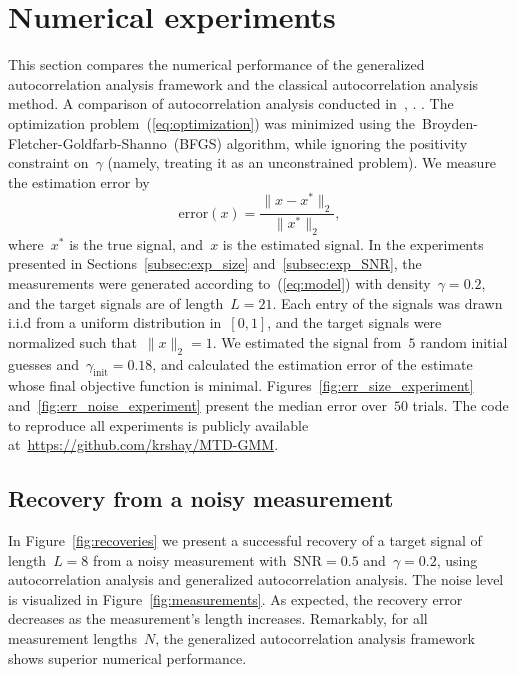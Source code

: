 \documentclass{article}
\newcommand{\rev}[1]{{\color{magenta}{#1}}}
\begin{document}
\section{Numerical experiments}
\label{sec:numerical}
This section compares the numerical performance of the generalized autocorrelation analysis framework and the classical autocorrelation analysis method. A comparison of autocorrelation analysis \rev{to a naive method that detects and extracts the signal occurrences, and then averages, was} conducted in~\cite{lan2020multi}, \cite{kreymer2021two}. \rev{While this method works well in a high SNR environment, it fails in low SNR regimes---the focal point of this paper---and thus omitted}. The optimization problem~(\ref{eq:optimization}) was minimized using the~\mbox{Broyden-Fletcher-Goldfarb-Shanno}~(BFGS) algorithm, while ignoring the positivity constraint on~$\gamma$ (namely, treating it as an unconstrained problem).  We measure the estimation error by
\begin{equation*}
\text{error}(x) = \frac{\|x - x^*\|_2}{\|x^*\|_2},
\end{equation*}
where~$x^*$ is the true signal, and~$x$ is the estimated signal. In the experiments presented in Sections~\ref{subsec:exp_size} and~\ref{subsec:exp_SNR}, the measurements were generated according to~(\ref{eq:model}) with density~\mbox{$\gamma = 0.2$}, and the target signals are of length~\mbox{$L = 21$}. Each entry of the signals was drawn i.i.d from a uniform distribution in~$[0,1]$, and the target signals were normalized such that~$\|x\|_2  =1$. We estimated the signal from~$5$ random initial guesses \rev{of the signal that were generated similarly to the ground truth signal} and~\mbox{$\gamma_{\text{init}} = 0.18$}, and calculated the estimation error of the \rev{signal} estimate whose final objective function is minimal. Figures~\ref{fig:err_size_experiment} and~\ref{fig:err_noise_experiment} present the median error over~$50$ trials. The code to reproduce all experiments is publicly available at~\url{https://github.com/krshay/MTD-GMM}.

\subsection{Recovery from a noisy measurement}
\label{subsec:exp_recovery}
In Figure~\ref{fig:recoveries} we present a successful recovery of a target signal of length~\mbox{$L = 8$} from a noisy measurement with~\mbox{$\text{SNR} = 0.5$} and~\mbox{$\gamma = 0.2$}, using autocorrelation analysis and generalized autocorrelation analysis. The noise level is visualized in Figure~\ref{fig:measurements}. As expected, the recovery error decreases  as the measurement's length increases. Remarkably, for all measurement lengths~$N$, the generalized autocorrelation analysis framework shows superior numerical performance.
\end{document}
